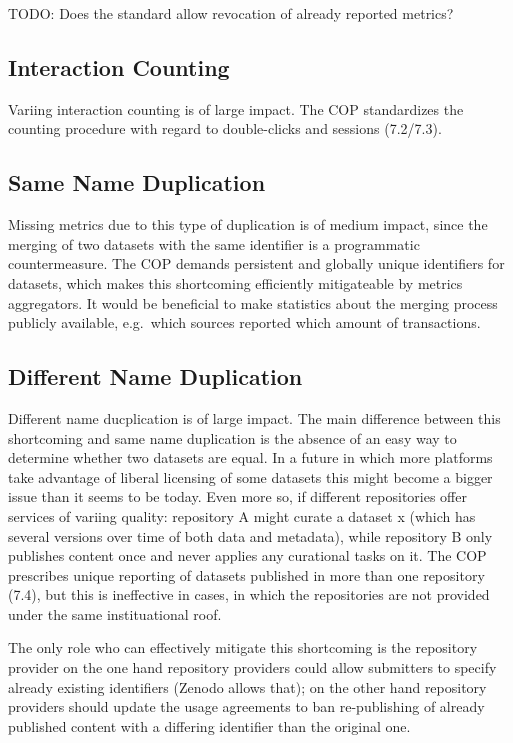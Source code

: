 \documentclass[conference, a4paper]{IEEEtran}\usepackage[]{graphicx}\usepackage[]{color}
\begin{document}
TODO: Does the standard allow revocation of already reported metrics?

\subsection{Interaction Counting}
Variing interaction counting is of large impact.
The COP standardizes the counting procedure with regard to double-clicks
and sessions (7.2/7.3).

\subsection{Same Name Duplication}

Missing metrics due to this type of duplication is of medium impact,
since the merging of two datasets with the same identifier is a programmatic countermeasure.
The COP demands persistent and globally unique
identifiers for datasets, which makes this shortcoming efficiently mitigateable
by metrics aggregators.
It would be beneficial to make statistics about the merging process publicly available,
e.g.\ which sources reported which amount of transactions.

\subsection{Different Name Duplication}
Different name ducplication is of large impact.
The main difference between this shortcoming and same name duplication is
the absence of an easy way to determine whether two datasets are equal.
In a future in which more platforms take advantage of liberal licensing of
some datasets this might become a bigger issue than it seems to be today.
Even more so, if different repositories offer services of variing quality:
repository A might curate a dataset x (which has several versions over time
of both data and metadata),
while repository B only publishes content once and never applies any curational
tasks on it.
The COP prescribes unique reporting of datasets published in more than one repository (7.4),
but this is ineffective in cases, in which the repositories are not provided under the
same instituational roof.

The only role who can effectively mitigate this shortcoming is the repository provider
on the one hand repository providers could allow submitters to specify already
existing identifiers (Zenodo allows that);
on the other hand repository providers should update the usage agreements to
ban re-publishing of already published content with a differing
identifier than the original one.
\end{document}
